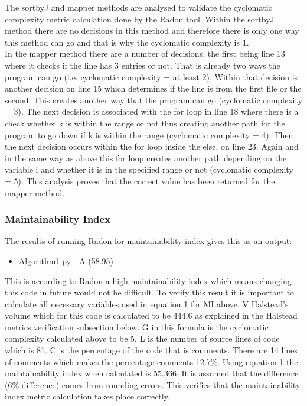 \documentclass[11pt,journal, a4paper]{IEEEtran}
\begin{document}
\noindent 
The sortbyJ and mapper methods are analysed to validate the cyclomatic complexity metric calculation done by the Radon tool. Within the sortbyJ method there are no decisions in this method and therefore there is only one way this method can go and that is why the cyclomatic complexity is 1. \\

\noindent 
In the mapper method there are a number of decisions, the first being line 13 where it checks if the line has 3 entries or not. That is already two ways the program can go (i.e. cyclomatic complexity = at least 2). Within that decision is another decision on line 15 which determines if the line is from the first file or the second. This creates another way that the program can go (cyclomatic complexity = 3). The next decision is associated with the for loop in line 18 where there is a check whether k is within the range or not thus creating another path for the program to go down if k is within the range (cyclomatic complexity = 4). Then the next decision occurs within the for loop inside the else, on line 23. Again and in the same way as above this for loop creates another path depending on the variable i and whether it is in the specified range or not (cyclomatic complexity = 5). This analysis proves that the correct value has been returned for the mapper method. 



\subsubsection{Maintainability Index}
\noindent
The results of running Radon for maintainability index gives this as an output:
\begin{itemize}
\item Algorithm1.py - A (58.95)
\end{itemize}

\noindent
This is according to Radon a high maintainability index which means changing this code in future would not be difficult. To verify this result it is important to calculate all necessary variables used in equation 1 for MI above. V Halstead's volume which for this code is calculated to be 444.6 as explained in the Halstead metrics verification subsection below. G in this formula is the cyclomatic complexity calculated above to be 5. L is the number of source lines of code which is 81. C is the percentage of the code that is comments. There are 14 lines of comments which makes the percentage comments 12.7\%. Using equation 1 the maintainability index when calculated is 55.366. It is assumed that the difference (6\% difference) comes from rounding errors. This verifies that the maintainability index metric calculation takes place correctly. 
\end{document}
